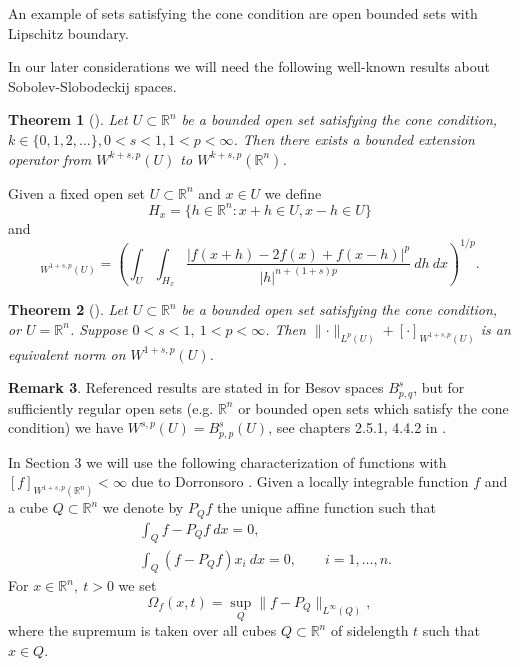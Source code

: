 \documentclass[11pt]{amsart}
\newcommand{\R}{\mathbb{R}}
\newtheorem{theorem}{Theorem}[section]
\theoremstyle{definition}
\newtheorem{remark}[theorem]{Remark}
\begin{document}
	An example of sets satisfying the cone condition are open bounded sets with Lipschitz boundary.
	
	In our later considerations we will need the following well-known results about Sobolev-Slobodeckij spaces.
	
	\begin{theorem}[{\cite[4.2.3/Theorem]{triebel1978interpolation}}]\label{thm:extension}
		Let $U\subset\R^n$ be a bounded open set satisfying the cone condition, $k\in\{0,1,2,\dots\}, 0<s<1, 1<p<\infty$. Then there exists a bounded extension operator from $W^{k+s,p}(U)$ to $W^{k+s,p}(\R^n)$.
	\end{theorem}	
	
	Given a fixed open set $U\subset\R^n$ and $x\in U$ we define
	\[H_x=\{h\in\R^n: x+h\in U,x-h\in U\}
	\]
	and
	\begin{equation*}
	[f]_{W^{1+s,p}( U)} =  \left(\int_{ U}\int_{H_x}\frac{|f(x+h)-2f(x)+f(x-h)|^p}{|h|^{n+(1+s)p}}\ dh\ dx \right)^{1/p}.
	\end{equation*}

	
	\begin{theorem}[{\cite[2.5.1/Theorem, 4.4.2/Theorem 2]{triebel1978interpolation}}]\label{thm:equivalent_norm}
		Let $ U\subset\R^n$ be a bounded open set satisfying the cone condition, or $ U=\R^n$. Suppose $0<s<1,\ 1< p< \infty$. Then $\lVert\cdot\rVert_{L^p( U)}+[\cdot]_{W^{1+s,p}( U)}$ is an equivalent norm on $W^{1+s,p}( U)$.
		
	\end{theorem}	
	
	
	\begin{remark}
		Referenced results are stated in \cite{triebel1978interpolation} for Besov spaces $B^s_{p,q}$, but for sufficiently regular open sets (e.g. $\R^n$ or bounded open sets which satisfy the cone condition) we have $W^{s,p}( U)=B^s_{p,p}( U)$, see chapters 2.5.1, 4.4.2 in {\cite{triebel1978interpolation}}.
	\end{remark}	
	
	In Section 3 we will use the following characterization of functions with $[f]_{W^{1+s,p}(\R^n)}<\infty$ due to Dorronsoro \cite{dorronsoro1985mean}.
	Given a locally integrable function $f$ and a cube $Q\subset\R^n$ we denote by $P_Q f$ the unique affine function such that
	\begin{align*}
	&\int_Q f-P_Qf\ dx =0,\\
	&\int_Q (f-P_Qf)x_i\ dx =0,\qquad i=1,\dots,n.
	\end{align*}
	For $x\in\R^n,\ t>0$ we set
	\begin{equation*}
	\Omega_f(x,t)=\sup_Q \lVert f-P_Q\rVert_{L^{\infty}(Q)},
	\end{equation*}
	where the supremum is taken over all cubes $Q\subset\R^n$ of sidelength $t$ such that $x\in Q$.
	
\end{document}
